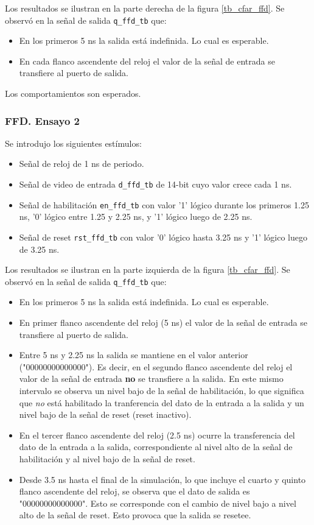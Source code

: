 Los resultados se ilustran en la parte derecha de la figura \ref{tb_cfar_ffd}. Se observó en la señal de salida \texttt{q\_ffd\_tb} que:

\begin{itemize}
\item En los primeros 5 ns la salida está indefinida. Lo cual es esperable.
\item En cada flanco ascendente del reloj el valor de la señal de entrada se transfiere al puerto de salida.
\end{itemize}

Los comportamientos son esperados.


\subsubsection{FFD. Ensayo 2}

Se introdujo los siguientes estímulos:
\begin{itemize}
\item Señal de reloj de 1 ns de periodo.
\item Señal de video de entrada \texttt{d\_ffd\_tb} de 14-bit cuyo valor crece cada 1 ns.
\item Señal de habilitación \texttt{en\_ffd\_tb} con valor '1' lógico durante los primeros 1.25 ns, '0' lógico entre 1.25 y 2.25 ns, y '1' lógico luego de 2.25 ns.
\item Señal de reset \texttt{rst\_ffd\_tb} con valor '0' lógico hasta 3.25 ns y '1' lógico luego de 3.25 ns.
\end{itemize}


Los resultados se ilustran en la parte izquierda de la figura \ref{tb_cfar_ffd}. Se observó en la señal de salida \texttt{q\_ffd\_tb} que:

\begin{itemize}
\item En los primeros 5 ns la salida está indefinida. Lo cual es esperable.
\item En primer flanco ascendente del reloj (5 ns) el valor de la señal de entrada se transfiere al puerto de salida.
\item Entre 5 ns y 2.25 ns la salida se mantiene en el valor anterior ("00000000000000"). Es decir, en el segundo flanco ascendente del reloj el valor de la señal de entrada \textbf{no} se transfiere a la salida. En este mismo intervalo se observa un nivel bajo de la señal de habilitación, lo que significa que \textit{no} está habilitado la tranferencia del dato de la entrada a la salida y un nivel bajo de la señal de reset (reset inactivo).
\item En el tercer flanco ascendente del reloj (2.5 ns) ocurre la transferencia del dato de la entrada a la salida, correspondiente al nivel alto de la señal de habilitación y al nivel bajo de la señal de reset.
\item Desde 3.5 ns hasta el final de la simulación, lo que incluye el cuarto y quinto flanco ascendente del reloj, se observa que el dato de salida es "00000000000000". Esto se corresponde con el cambio de nivel bajo a nivel alto de la señal de reset. Esto provoca que la salida se resetee.
\end{itemize}

